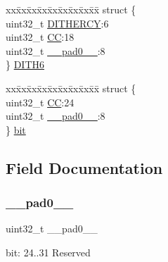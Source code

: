 \begin{DoxyCompactItemize}
\begin{tabbing}
\end{tabbing}\item 
\begin{tabbing}
xx\=xx\=xx\=xx\=xx\=xx\=xx\=xx\=xx\=\kill
struct \{\\
\>uint32\_t \mbox{\hyperlink{union_t_c_c___c_c___type_a1e7fc84641e39de898f29ee9268f22aa}{DITHERCY}}:6\\
\>uint32\_t \mbox{\hyperlink{union_t_c_c___c_c___type_a10f2b0518af5a37e14c710d230272d1d}{CC}}:18\\
\>uint32\_t \mbox{\hyperlink{union_t_c_c___c_c___type_a3e57c2ef1c3ffb36722f000cc1156824}{\_\_pad0\_\_}}:8\\
\} \mbox{\hyperlink{union_t_c_c___c_c___type_ab7c5bddbb18d228109499e5a72edaaae}{DITH6}}\\

\end{tabbing}\item 
\begin{tabbing}
xx\=xx\=xx\=xx\=xx\=xx\=xx\=xx\=xx\=\kill
struct \{\\
\>uint32\_t \mbox{\hyperlink{union_t_c_c___c_c___type_a10f2b0518af5a37e14c710d230272d1d}{CC}}:24\\
\>uint32\_t \mbox{\hyperlink{union_t_c_c___c_c___type_a3e57c2ef1c3ffb36722f000cc1156824}{\_\_pad0\_\_}}:8\\
\} \mbox{\hyperlink{union_t_c_c___c_c___type_a8eafb0672ade89226d777e71f8839ebf}{bit}}\\

\end{tabbing}\end{DoxyCompactItemize}


\subsection{Field Documentation}
\mbox{\label{union_t_c_c___c_c___type_a3e57c2ef1c3ffb36722f000cc1156824}} 
\subsubsection{\texorpdfstring{\_\_pad0\_\_}{\_\_pad0\_\_}}
{\footnotesize\ttfamily uint32\+\_\+t \+\_\+\+\_\+pad0\+\_\+\+\_\+}

bit\+: 24..31 Reserved \mbox{\label{union_t_c_c___c_c___type_aab9c20a1a6d1b1582ba9b26a9367a4f7}} 
